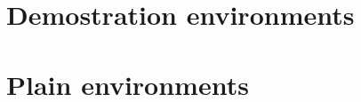 \documentclass[toc,todo,libertinus]{apuntes}
\begin{document}
\begin{prop}[][reff]
	\lipsum[1]
\end{prop}

\begin{teorema}[][reff]
	\lipsum[1]
\end{teorema}

\begin{corolario}[][reff]
	\lipsum[1]
\end{corolario}

\begin{lema}[][reff]
	\lipsum[1]
\end{lema}

\section{Demostration environments}

\begin{dem}[]
	\lipsum[1]
\end{dem}

\begin{sol}[]
	\lipsum[1]
\end{sol}

\section{Plain environments}

\begin{aff}[]
	\lipsum[1]
\end{aff}

\begin{ejemplo}[][reff]
	\lipsum[1]
\end{ejemplo}

\begin{ejercicio}[][reff]
	\lipsum[1]
\end{ejercicio}

\begin{pregunta}[][reff]
	\lipsum[1]
\end{pregunta}

\begin{obs}[][reff]
	\lipsum[1]
\end{obs}

\begin{notacion}[]
	\lipsum[1]
\end{notacion}

\begin{recuerdo}[]
	\lipsum[1]
\end{recuerdo}

\begin{nota}[]
	\lipsum[1]
\end{nota}
\end{document}
